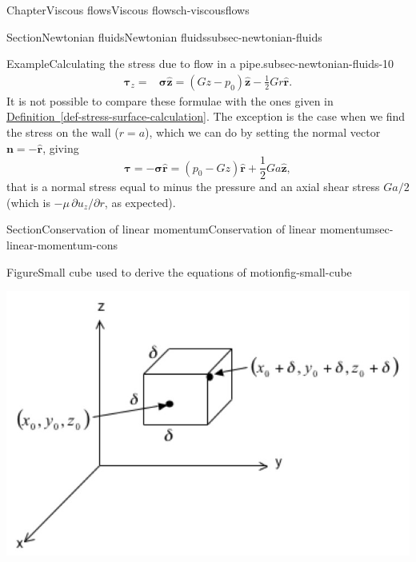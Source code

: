 \documentclass[oneside,10pt,]{book}
\newcommand{\xreffont}{\relax}
\numberwithin{equation}{section}
\newcommand{\bn}{\boldsymbol{n}}
\newcommand{\bsigma}{\boldsymbol{\sigma}}
\newcommand{\btau}{\boldsymbol{\tau}}
\begin{document}
\begin{chapterptx}{Chapter}{Viscous flows}{}{Viscous flows}{}{}{ch-viscousflows}
\begin{sectionptx}{Section}{Newtonian fluids}{}{Newtonian fluids}{}{}{subsec-newtonian-fluids}
\begin{example}{Example}{Calculating the stress due to flow in a pipe.}{subsec-newtonian-fluids-10}
\begin{align*}
\btau_z=&\bsigma\hat{\boldsymbol{z}}=\left(Gz-p_0\right)\hat{\boldsymbol{z}}-\frac12Gr\hat{\boldsymbol{r}}.
\end{align*}
It is not possible to compare these formulae with the ones given in \hyperref[def-stress-surface-calculation]{Definition~{\xreffont\ref{def-stress-surface-calculation}}}. The exception is the case when we find the stress on the wall (\(r=a\)), which we can do by setting the normal vector \(\bn=-\hat{\boldsymbol{r}}\), giving%
\begin{equation*}
\btau=-\bsigma\hat{\boldsymbol{r}}=\left(p_0-Gz\right)\hat{\boldsymbol{r}}+\frac12Ga\hat{\boldsymbol{z}},
\end{equation*}
that is a normal stress equal to minus the pressure and an axial shear stress \(Ga/2\) (which is \(-\mu\,\partial u_z/\partial r\), as expected).%
\end{example}
\end{sectionptx}
%
%
\typeout{************************************************}
\typeout{************************************************}
%
\begin{sectionptx}{Section}{Conservation of linear momentum}{}{Conservation of linear momentum}{}{}{sec-linear-momentum-cons}
\begin{introduction}{}%
\begin{figureptx}{Figure}{Small cube used to derive the equations of motion}{fig-small-cube}{}%
\begin{image}{0.25}{0.5}{0.25}{}%
\includegraphics[width=\linewidth]{external/ch-chapter07-small-cube.jpg}
\end{image}%
\tcblower
\end{figureptx}%

\end{introduction}
\end{sectionptx}
\end{chapterptx}
\end{document}
